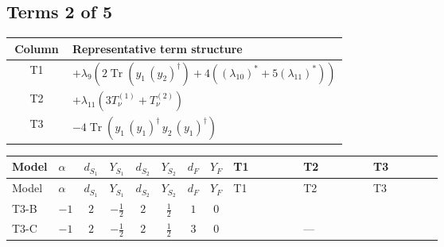 \documentclass[8pt]{article}
\begin{document}
\begin{landscape}
\subsection*{Terms 2 of 5}
\begin{center}
\begin{tabular}{@{}c >{\raggedright\arraybackslash}p{0.82\linewidth}@{}}
\toprule
Column & Representative term structure \\
\midrule
T1 & \(\displaystyle +{\lambda_{9}} (2 \operatorname{Tr}\!\left({y_1}\,\left({y_2}\right)^{\dagger}\right)+4 (\left({\lambda_{10}}\right)^{*}+5 \left({\lambda_{11}}\right)^{*}))\) \\
\midrule
T2 & \(\displaystyle +{\lambda_{11}} (3 T_{\nu}^{(1)}+T_{\nu}^{(2)})\) \\
\midrule
T3 & \(\displaystyle -4 \operatorname{Tr}\!\left({y_1}\,\left({y_1}\right)^{\dagger}\,{y_2}\,\left({y_1}\right)^{\dagger}\right)\) \\
\midrule
\bottomrule
\end{tabular}
\end{center}
\smallskip
\tiny
\begin{longtable}{@{}llcccccc >{\raggedright\arraybackslash}p{0.21\linewidth} >{\raggedright\arraybackslash}p{0.21\linewidth} >{\raggedright\arraybackslash}p{0.21\linewidth}@{}}
\toprule
Model & $\alpha$ & $d_{S_1}$ & $Y_{S_1}$ & $d_{S_2}$ & $Y_{S_2}$ & $d_F$ & $Y_F$ & T1 & T2 & T3 \\
\midrule
\endfirsthead
\toprule
Model & $\alpha$ & $d_{S_1}$ & $Y_{S_1}$ & $d_{S_2}$ & $Y_{S_2}$ & $d_F$ & $Y_F$ & T1 & T2 & T3 \\
\midrule
\endhead
T3-B & $-1$ & $2$ & $-\frac{1}{2}$ & $2$ & $\frac{1}{2}$ & $1$ & $0$ & \scriptsize\adjustbox{max width=\linewidth}{$\begin{gathered} +{\lambda_{9}} (2 \operatorname{Tr}\!\left({y_1}\,\left({y_2}\right)^{\dagger}\right)+4 (\left({\lambda_{10}}\right)^{*}+5 \left({\lambda_{11}}\right)^{*}))\end{gathered}$} & \scriptsize\adjustbox{max width=\linewidth}{$\begin{gathered} +{\lambda_{11}} (3 T_{\nu}^{(1)}+T_{\nu}^{(2)})\end{gathered}$} & \scriptsize\adjustbox{max width=\linewidth}{$\begin{gathered} -4 \operatorname{Tr}\!\left({y_1}\,\left({y_1}\right)^{\dagger}\,{y_2}\,\left({y_1}\right)^{\dagger}\right)\end{gathered}$} \\
\midrule
T3-C & $-1$ & $2$ & $-\frac{1}{2}$ & $2$ & $\frac{1}{2}$ & $3$ & $0$ & \scriptsize\adjustbox{max width=\linewidth}{$\begin{gathered} +{\lambda_{9}} (3 \operatorname{Tr}\!\left({y_1}\,\left({y_2}\right)^{\dagger}\right)+4 (\left({\lambda_{10}}\right)^{*}+5 \left({\lambda_{11}}\right)^{*}))\end{gathered}$} & --- & \scriptsize\adjustbox{max width=\linewidth}{$\begin{gathered} -5 \operatorname{Tr}\!\left({y_1}\,\left({y_1}\right)^{\dagger}\,{y_2}\,\left({y_1}\right)^{\dagger}\right)\end{gathered}$} \\

\end{longtable}
\end{landscape}
\end{document}
